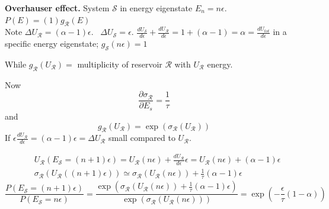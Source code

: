  \textbf{Overhauser effect.}  System $\mathcal{S}$ in energy eigenstate $E_n = n\epsilon$.  \\
$P(E) = (1) g_{\mathcal{R}}(E)$ \\
Note $\Delta U_{\mathcal{R}} = (\alpha - 1 )\epsilon$.  \quad \, $\Delta U_{\mathcal{S}} = \epsilon$.  $\frac{dU_{\mathcal{S}} }{ d\epsilon } + \frac{dU_{\mathcal{R} }}{d\epsilon } =  1 + (\alpha -1) = \alpha = \frac{dU_{tot}}{d\epsilon }$ in a specific energy eigenstate; $g_{\mathcal{S} }(n\epsilon) = 1$  

While $g_{\mathcal{R}}(U_{\mathcal{R}}) =$ multiplicity of reservoir $\mathcal{R}$ with $U_{\mathcal{R}}$ energy.  

Now
\[
\frac{ \partial \sigma_{\mathcal{R}} }{ \partial E_s } = \frac{1}{\tau}
\]
and 
\[
g_{\mathcal{R} }(U_{\mathcal{R}}) = \exp{ ( \sigma_{\mathcal{R}}(U_{\mathcal{R}} ) )}
\]
If $\epsilon \frac{dU_{\mathcal{R}} }{ d\epsilon } = (\alpha - 1)\epsilon = \Delta U_{\mathcal{R}}$ small compared to $U_{\mathcal{R}}$.  

\[
\begin{aligned}
  & U_{\mathcal{R}}( E_{\mathcal{S} } = (n+1)\epsilon ) = U_{\mathcal{R} }(n\epsilon ) + \frac{dU_{\mathcal{R}} }{ d\epsilon } \epsilon = U_{\mathcal{R}}(n\epsilon ) + (\alpha - 1)\epsilon  \\
  & \sigma_{\mathcal{R}}(U_{\mathcal{R} }((n+1)\epsilon ) ) \simeq \sigma_{\mathcal{R} }(U_{\mathcal{R}}(n\epsilon )) + \frac{1}{\tau} (\alpha - 1) \epsilon 
\end{aligned}
\]
\[
\frac{ P(E_{\mathcal{S}} = (n+1)\epsilon ) }{ P(E_{\mathcal{S}} = n\epsilon ) } = \frac{ \exp{ ( \sigma_{\mathcal{R}}(U_{\mathcal{R}}(n\epsilon) ) + \frac{1}{\tau}(\alpha -1)\epsilon ) } }{ \exp{ (\sigma_{\mathcal{R}} (U_{\mathcal{R}}(n\epsilon) ) )} } = \boxed{ \exp{ \left( - \frac{\epsilon}{\tau} ( 1 - \alpha ) \right) } }
\]







